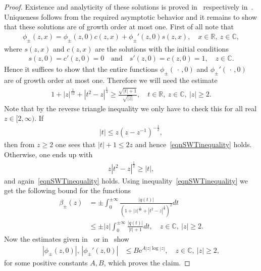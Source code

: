 \documentclass{amsart}
\numberwithin{equation}{section}
\begin{document}
\begin{proof}
Existence and analyticity of these solutions is proved in~\cite[Section~2]{chelkak} respectively in~\cite[Section~3]{ckk}.
Uniqueness follows from the required asymptotic behavior and it remains to show that these solutions are of growth order at most one.
First of all note that 
\begin{align*}
  \phi_\pm(z,x) = \phi_\pm(z,0) c(z,x) + \phi_\pm'(z,0) s(z,x), \quad x\in{{\mathbb R}},~z\in{{\mathbb C}},
\end{align*}
where $s(z,x)$ and $c(z,x)$ are the solutions with the initial conditions
\begin{align*}
  s(z,0) = c'(z,0) = 0 \quad\text{and}\quad s'(z,0) = c(z,0) = 1, \quad z\in{{\mathbb C}}.
\end{align*}
Hence it suffices to show that the entire functions $\phi_\pm(\,\cdot\,,0)$ and $\phi_\pm'(\,\cdot\,,0)$ are of growth order at most one.    
Therefore we will need the estimate
\begin{align}\tag{$*$}\label{eqnSWTinequality}
  1 + \left|z\right|^{\frac{1}{12}} + \left|t^2-z\right|^{\frac{1}{4}} \geq \frac{\sqrt{|t|+1}}{\sqrt{|z|}}, \quad t\in{{\mathbb R}},~z\in{{\mathbb C}},~|z|\geq 2.
\end{align}
Note that by the reverse triangle inequality we only have to check this for all real $z\in[2,\infty)$. If 
\begin{align*}
 |t| \leq z (z-z^{-1})^{-\frac{1}{2}},
\end{align*}
then from $z\geq 2$ one sees that $|t|+1 \leq 2z$ and hence~\eqref{eqnSWTinequality} holds. 
Otherwise, one ends up with
\begin{align*}
   z |t^2-z|^{\frac{1}{2}} \geq |t|,
\end{align*} 
and again~\eqref{eqnSWTinequality} holds.
Using inequality~\eqref{eqnSWTinequality} we get the following bound for the functions
 \begin{align*}
   \beta_\pm(z) & = \pm \int_0^{\pm\infty} \frac{|q(t)|}{\left(1+|z|^{\frac{1}{12}}+|t^2 - z|^{\frac{1}{4}}\right)^2} dt  \\
    & \leq \pm |z| \int_0^{\pm\infty} \frac{|q(t)|}{|t|+1}dt, \quad z\in{{\mathbb C}},~|z|\geq 2.
\end{align*}   
Now the estimates given in~\cite[Lemma~3.2]{ckk} or in~\cite[Corollary~2.6]{chelkak} show
\begin{align*}
    |\phi_\pm(z,0)|,\,|\phi_\pm'(z,0)| & \leq B {\mathrm{e}}^{A |z|\log|z|}, \quad z\in{{\mathbb C}},~|z|\geq 2,    
\end{align*}
for some positive constants $A,B$, which proves the claim. 
\end{proof}
  
\end{document}
